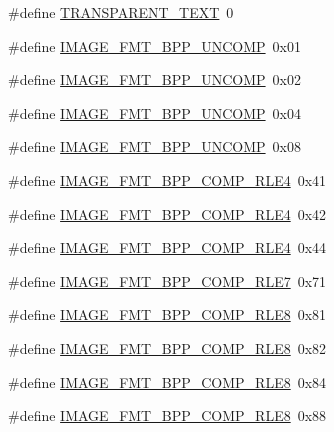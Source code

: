 \begin{DoxyCompactItemize}
\item 
\#define \hyperlink{group__primitives__api_gad695acdc62140c7331ceca34a5b7ee3a}{T\+R\+A\+N\+S\+P\+A\+R\+E\+N\+T\+\_\+\+T\+E\+X\+T}~0
\item 
\#define \hyperlink{group__primitives__api_gaf52f1ace0da5f096d0523287d82bb2f0}{I\+M\+A\+G\+E\+\_\+\+F\+M\+T\+\_\+B\+P\+P\+\_\+\+U\+N\+C\+O\+M\+P}~0x01
\item 
\#define \hyperlink{group__primitives__api_gae21c6254656f549acab02d0015f02062}{I\+M\+A\+G\+E\+\_\+\+F\+M\+T\+\_\+B\+P\+P\+\_\+\+U\+N\+C\+O\+M\+P}~0x02
\item 
\#define \hyperlink{group__primitives__api_ga68d128062b1b4fb7efcc48d13efc74ce}{I\+M\+A\+G\+E\+\_\+\+F\+M\+T\+\_\+B\+P\+P\+\_\+\+U\+N\+C\+O\+M\+P}~0x04
\item 
\#define \hyperlink{group__primitives__api_gac27c5571d2b7ea9f81c70defb0d8ec97}{I\+M\+A\+G\+E\+\_\+\+F\+M\+T\+\_\+B\+P\+P\+\_\+\+U\+N\+C\+O\+M\+P}~0x08
\item 
\#define \hyperlink{group__primitives__api_ga379188b1df5d4ee2cf83eec447362cc5}{I\+M\+A\+G\+E\+\_\+\+F\+M\+T\+\_\+B\+P\+P\+\_\+\+C\+O\+M\+P\+\_\+\+R\+L\+E4}~0x41
\item 
\#define \hyperlink{group__primitives__api_ga292f87814ebe2868d1e6f3f3c5c3c0a7}{I\+M\+A\+G\+E\+\_\+\+F\+M\+T\+\_\+B\+P\+P\+\_\+\+C\+O\+M\+P\+\_\+\+R\+L\+E4}~0x42
\item 
\#define \hyperlink{group__primitives__api_ga8a9dc5858e40e6b42942e8f379fef92c}{I\+M\+A\+G\+E\+\_\+\+F\+M\+T\+\_\+B\+P\+P\+\_\+\+C\+O\+M\+P\+\_\+\+R\+L\+E4}~0x44
\item 
\#define \hyperlink{group__primitives__api_ga2f4116b74a4471c248927d2b7065c5cc}{I\+M\+A\+G\+E\+\_\+\+F\+M\+T\+\_\+B\+P\+P\+\_\+\+C\+O\+M\+P\+\_\+\+R\+L\+E7}~0x71
\item 
\#define \hyperlink{group__primitives__api_ga69328ee0c502505ea2c8a583551e92c2}{I\+M\+A\+G\+E\+\_\+\+F\+M\+T\+\_\+B\+P\+P\+\_\+\+C\+O\+M\+P\+\_\+\+R\+L\+E8}~0x81
\item 
\#define \hyperlink{group__primitives__api_ga8ba6d2c7a4793132f76b305ffbd4e35b}{I\+M\+A\+G\+E\+\_\+\+F\+M\+T\+\_\+B\+P\+P\+\_\+\+C\+O\+M\+P\+\_\+\+R\+L\+E8}~0x82
\item 
\#define \hyperlink{group__primitives__api_gabb7ca1f563cf8d168daea6f068df6433}{I\+M\+A\+G\+E\+\_\+\+F\+M\+T\+\_\+B\+P\+P\+\_\+\+C\+O\+M\+P\+\_\+\+R\+L\+E8}~0x84
\item 
\#define \hyperlink{group__primitives__api_ga474ba72ef6f424c3c378ed38a50e6bfa}{I\+M\+A\+G\+E\+\_\+\+F\+M\+T\+\_\+B\+P\+P\+\_\+\+C\+O\+M\+P\+\_\+\+R\+L\+E8}~0x88

\end{DoxyCompactItemize}
